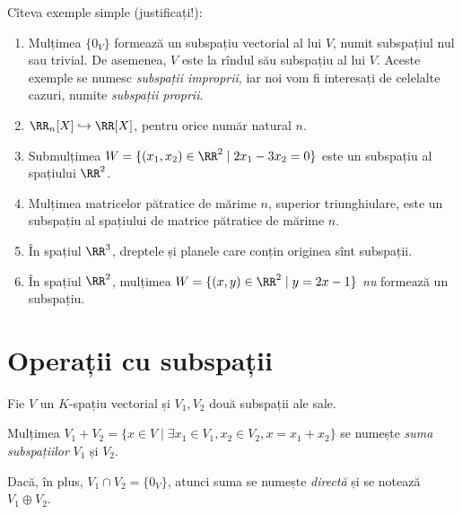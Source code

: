 
Cîteva exemple simple (justificați!):
\begin{enumerate}
    \item Mulțimea $ \{ 0_V \} $ formează un subspațiu vectorial al lui $ V $,
        numit subspațiul nul sau trivial. De asemenea, $ V $ este la rîndul
        său subspațiu al lui $ V $. Aceste exemple se numesc \emph{subspații improprii},
        iar noi vom fi interesați de celelalte cazuri, numite \emph{subspații proprii}.
    \item $ \RR_n[X] \hookrightarrow \RR[X] $, pentru orice număr natural $ n $.
    \item Submulțimea $ W = \{ (x_1, x_2) \in \RR^2 \mid 2x_1 - 3x_2 = 0 \} $ este
        un subspațiu al spațiului $ \RR^2 $.
    \item Mulțimea matricelor pătratice de mărime $ n $, superior triunghiulare,
        este un subspațiu al spațiului de matrice pătratice de mărime $ n $.
    \item În spațiul $ \RR^3 $, dreptele și planele care conțin originea sînt subspații.
    \item În spațiul $ \RR^2 $, mulțimea $ W = \{ (x, y) \in \RR^2 \mid y = 2x - 1 \} $
        \emph{nu} formează un subspațiu.
\end{enumerate}


\section{Operații cu subspații}

Fie $ V $ un $ K $-spațiu vectorial și $ V_1, V_2 $ două subspații ale sale.

\begin{definition}\label{def:suma-sp}
    Mulțimea $ V_1 + V_2 = \{ x \in V \mid \exists x_1 \in V_1, x_2 \in V_2, x = x_1 + x_2 \} $
    se numește \emph{suma subspațiilor} $ V_1 $ și $ V_2 $.

    Dacă, în plus, $ V_1 \cap V_2 = \{ 0_V \} $, atunci suma se numește \emph{directă}
    și se notează $ V_1 \oplus V_2 $.
\end{definition}

